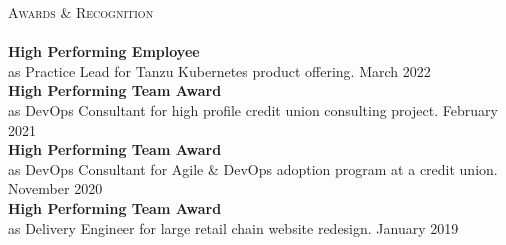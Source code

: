 \documentclass[letterpaper]{article}
\newcommand{\lineunder} {
    \vspace*{-8pt} \\
    \hspace*{-18pt} \hrulefill \\
}
\newcommand{\header} [1] {
    {\hspace*{-18pt}\vspace*{6pt} \textsc{#1}}
    \vspace*{-6pt} \lineunder
}
\begin{document}
\header{Awards \& Recognition}
\textbf{High Performing Employee}\\
as Practice Lead for Tanzu Kubernetes product offering. \hfill March 2022\\
\vspace*{2mm}
\textbf{High Performing Team Award}\\
as DevOps Consultant for high profile credit union consulting project. \hfill February 2021\\
\vspace*{2mm}
\textbf{High Performing Team Award}\\
as DevOps Consultant for Agile \& DevOps adoption program at a credit union. \hfill November 2020\\
\vspace*{2mm}
\textbf{High Performing Team Award}\\
as Delivery Engineer for large retail chain website redesign. \hfill January 2019\\
\vspace*{2mm}

\ 
\end{document}

